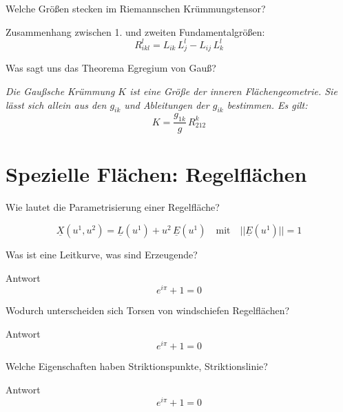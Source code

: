 \documentclass[twocolumn, fontsize=8pt, DIV=1]{scrartcl}
\begin{document}
\begin{framed}
    Welche Größen stecken im Riemannschen Krümmungstensor?
\end{framed}
Zusammenhang zwischen 1. und zweiten Fundamentalgrößen:
\[
    R_{ikl}^l = L_{ik} \, L_j^l - L_{ij} \, L_k^l
\]



\begin{framed}
    Was sagt uns das Theorema Egregium von Gauß?
\end{framed}
\textit{Die Gaußsche Krümmung $K$ ist eine Größe der inneren Flächengeometrie. Sie lässt sich allein aus den $g_{ik}$ und Ableitungen der $g_{ik}$ bestimmen. Es gilt:}
\[
    K = \frac{g_{1k}}{g} \, R_{212}^k
\]











\section{Spezielle Flächen: Regelflächen}



\begin{framed}
    Wie lautet die Parametrisierung einer Regelfläche?
\end{framed}
\[
    \underline{X}(u^1, u^2) = \underline{L}(u^1) + u^2\, \underline{E}(u^1)
    \quad \text{mit} \quad ||\underline{E}(u^1)|| = 1
\]



\begin{framed}
    Was ist eine Leitkurve, was sind Erzeugende?
\end{framed}
Antwort
\[
    e^{i\pi} + 1 = 0
\]



\begin{framed}
    Wodurch unterscheiden sich Torsen von windschiefen Regelflächen?
\end{framed}
Antwort
\[
    e^{i\pi} + 1 = 0
\]



\begin{framed}
    Welche Eigenschaften haben Striktionspunkte, Striktionslinie?
\end{framed}
Antwort
\[
    e^{i\pi} + 1 = 0
\]
\end{document}
